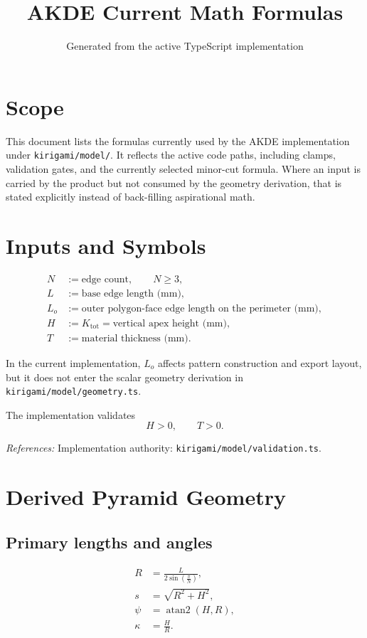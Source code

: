 \documentclass[11pt]{article}
\title{AKDE Current Math Formulas}
\author{}
\date{Generated from the active TypeScript implementation}
\newcommand{\formularefs}[1]{%
\par\smallskip
\noindent\footnotesize\textit{References: }#1
\par\smallskip\normalsize
}
\begin{document}
\maketitle

\section{Scope}

This document lists the formulas currently used by the AKDE implementation under
\texttt{kirigami/model/}. It reflects the active code paths, including clamps,
validation gates, and the currently selected minor-cut formula. Where an input
is carried by the product but not consumed by the geometry derivation, that is
stated explicitly instead of back-filling aspirational math.

\section{Inputs and Symbols}

\begin{align*}
N &:= \text{edge count}, \qquad N \ge 3, \\
L &:= \text{base edge length (mm)}, \\
L_o &:= \text{outer polygon-face edge length on the perimeter (mm)}, \\
H &:= K_{\mathrm{tot}} = \text{vertical apex height (mm)}, \\
T &:= \text{material thickness (mm)}.
\end{align*}

In the current implementation, \(L_o\) affects pattern construction and export
layout, but it does not enter the scalar geometry derivation in
\texttt{kirigami/model/geometry.ts}.

The implementation validates
\[
H > 0,
\qquad
T > 0.
\]

\formularefs{Implementation authority: \texttt{kirigami/model/validation.ts}.}

\section{Derived Pyramid Geometry}

\subsection{Primary lengths and angles}

\begin{align}
R &= \frac{L}{2\sin\!\left(\frac{\pi}{N}\right)}, \\
s &= \sqrt{R^2 + H^2}, \\
\psi &= \operatorname{atan2}(H,R), \\
\kappa &= \frac{H}{R}.
\end{align}
\end{document}
